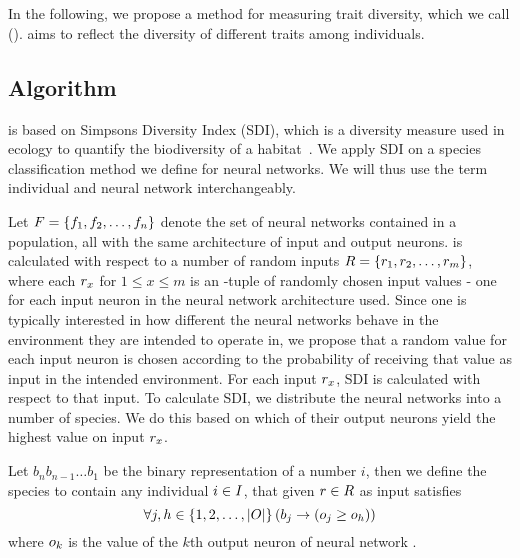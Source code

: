 \section{\di{}}\label{sec:nntd}
In the following, we propose a method for measuring trait diversity, which we call \emph{\di{}} (\dia). \dia{} aims to reflect the diversity of different traits among individuals. 

\subsection{Algorithm}
\dia{} is based on Simpsons Diversity Index (SDI), which is a diversity measure used in ecology to quantify the biodiversity of a habitat~\cite{simpson1949measurement}. We apply SDI on a species classification method we define for neural networks. We will thus use the term individual and neural network interchangeably.

Let $F = \left\{ f_1, f_2, \dots, f_n \right\}$ denote the set of neural networks contained in a population, all with the same architecture of \nninsetl{} input and \nnoutsetl{} output neurons. \dia{} is calculated with respect to a number of random inputs $R = \left\{ r_1, r_2, \dots, r_m \right\}$, where each $r_x$ for $1 \leq x \leq m$ is an \nninsetl-tuple of randomly chosen input values - one for each input neuron in the neural network architecture used.
Since one is typically interested in how different the neural networks behave in the environment they are intended to operate in, we propose that a random value for each input neuron is chosen according to the probability of receiving that value as input in the intended environment. For each input $r_x$, SDI is calculated with respect to that input.
To calculate SDI, we distribute the neural networks into a number of species.
We do this based on which of their output neurons yield the highest value on input $r_x$. 

Let $b_{n}b_{n-1}\dots b_1$ be the binary representation of a number $i$,
then we define the species  to contain any individual $i \in I$, that given $r \in R$ as input satisfies
%
\[
  \forall j, h \in \left\{ 1, 2, \dots, \lvert O\rvert \right\} \left(b_j \rightarrow \left(o_j \geq o_h\right)\right)
\]
%
where $o_k$ is the value of the $k$th output neuron of neural network \ind.

